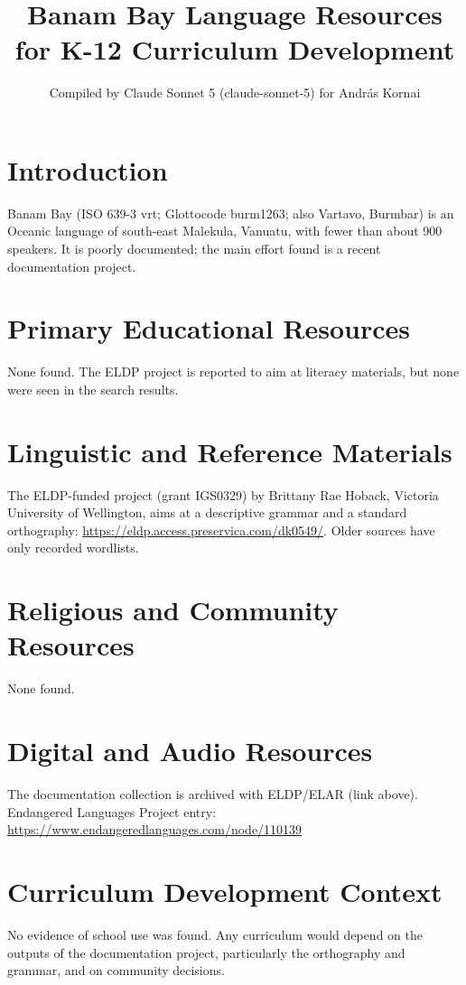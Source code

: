 \documentclass[12pt]{article}
\title{Banam Bay Language Resources for K-12 Curriculum Development}
\author{Compiled by Claude Sonnet 5 (claude-sonnet-5) for Andr\'as Kornai}
\date{}
\begin{document}
\maketitle
\section{Introduction}
Banam Bay (ISO 639-3 vrt; Glottocode burm1263; also Vartavo, Burmbar) is an Oceanic language of south-east Malekula, Vanuatu, with fewer than about 900 speakers. It is poorly documented; the main effort found is a recent documentation project.
\section{Primary Educational Resources}
None found. The ELDP project is reported to aim at literacy materials, but none were seen in the search results.
\section{Linguistic and Reference Materials}
The ELDP-funded project (grant IGS0329) by Brittany Rae Hoback, Victoria University of Wellington, aims at a descriptive grammar and a standard orthography: \url{https://eldp.access.preservica.com/dk0549/}. Older sources have only recorded wordlists.
\section{Religious and Community Resources}
None found.
\section{Digital and Audio Resources}
The documentation collection is archived with ELDP/ELAR (link above). Endangered Languages Project entry: \url{https://www.endangeredlanguages.com/node/110139}
\section{Curriculum Development Context}
No evidence of school use was found. Any curriculum would depend on the outputs of the documentation project, particularly the orthography and grammar, and on community decisions.
\end{document}
